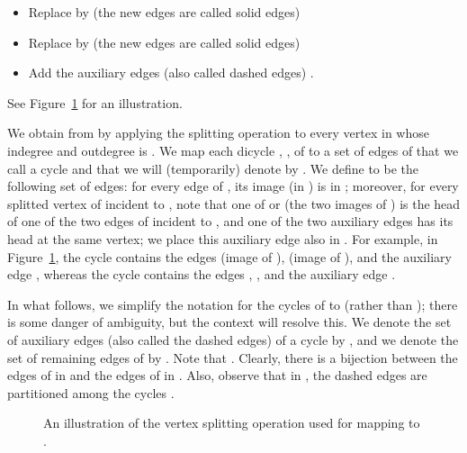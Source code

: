\documentclass[11pt]{article}
\begin{document}
\begin{itemize}
\item Replace  by  (the new edges are called solid edges)
\item Replace  by  (the new edges are called solid edges)
\item Add the auxiliary edges (also called dashed edges)
	.
\end{itemize}

See Figure~\ref{fig:vertexsplit} for an illustration.

We obtain  from  by applying the splitting operation to
every vertex in  whose indegree and outdegree is .
We map each dicycle , , of 
to a set of edges of  that we call a cycle
and that we will (temporarily) denote by .
We define  to be the following set of edges:
for every edge of , its image (in ) is in ;
moreover, for every splitted vertex  of  incident to ,
note that one of  or  (the two images of )
is the head of one of the two edges of  incident to ,
and one of the two auxiliary edges 
has its head at the same vertex;
we place this auxiliary edge also in .
For example, in Figure~\ref{fig:vertexsplit},
the cycle  contains the edges
 (image of ),
 (image of ), and the auxiliary edge ,
whereas the cycle  contains the edges
, , and
the auxiliary edge .

In what follows,
we simplify the notation for the cycles of 
to  (rather than );
there is some danger of ambiguity, but the context will resolve this.
We denote the set of auxiliary edges (also called the dashed edges)
of a cycle  by ,
and we denote the set of remaining edges of  by .
Note that 
.
Clearly, there is a bijection between the edges of 
in  and the edges of  in .
Also, observe that in ,
the dashed edges are partitioned among the cycles .



\begin{figure}
\begin{center}
\end{center}
\caption{ An illustration of the vertex splitting operation used for
	mapping  to .}
\label{fig:vertexsplit}
\end{figure}
\end{document}
